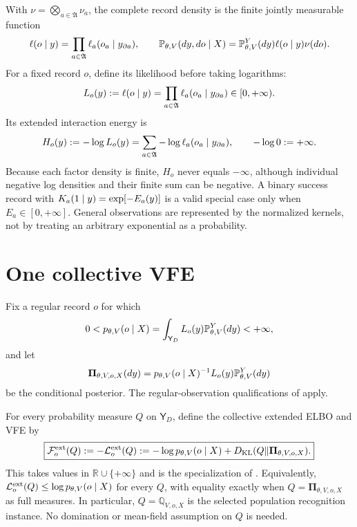 With $\nu=\bigotimes_{a\in\mathfrak A}\nu_a$, the complete record density is
the finite jointly measurable function
\begin{equation}
\ell(o\mid y)=\prod_{a\in\mathfrak A}
\ell_a(o_a\mid y_{\partial a}),
\qquad
\mathbb P_{\theta,V}(dy,do\mid X)
=\mathbb P_{\theta,V}^{Y}(dy)\ell(o\mid y)\nu(do).
\label{eq:obs-complete-record-kernel-density}
\end{equation}
For a fixed record $o$, define its likelihood before taking logarithms:
\begin{equation}
L_o(y):=\ell(o\mid y)
=\prod_{a\in\mathfrak A}\ell_a(o_a\mid y_{\partial a})
\in[0,+\infty).
\label{eq:obs-complete-record-likelihood}
\end{equation}
Its extended interaction energy is
\begin{equation}
H_o(y):=-\log L_o(y)
=\sum_{a\in\mathfrak A}-\log\ell_a(o_a\mid y_{\partial a}),
\qquad -\log0:=+\infty.
\label{eq:obs-interaction-energy}
\end{equation}
Because each factor density is finite, $H_o$ never equals $-\infty$, although
individual negative log densities and their finite sum can be negative.  A
binary success record with
$K_a(1\mid y)=\exp[-E_a(y)]$ is a valid special case only when
$E_a\in[0,+\infty]$.  General observations are represented by the normalized
kernels, not by treating an arbitrary exponential as a probability.

\section{One collective VFE}
\label{sec:local-collective-vfe}

Fix a regular record $o$ for which
\begin{equation}
0<p_{\theta,V}(o\mid X)
=\int_{\mathsf Y_D}L_o(y)\mathbb P_{\theta,V}^{Y}(dy)
<+\infty,
\label{eq:obs-global-evidence}
\end{equation}
and let
\begin{equation}
\boldsymbol\Pi_{\theta,V,o,X}(dy)
=p_{\theta,V}(o\mid X)^{-1}
L_o(y)\mathbb P_{\theta,V}^{Y}(dy)
\label{eq:obs-global-posterior}
\end{equation}
be the conditional posterior.  The regular-observation qualifications of
 apply.

For every probability measure \(Q\) on \(\mathsf Y_D\), define the collective
extended ELBO and VFE by
\begin{equation}
\boxed{
\mathcal F_o^{\rm ext}(Q):=-\mathcal L_o^{\rm ext}(Q)
:=-\log p_{\theta,V}(o\mid X)
+D_{\mathrm{KL}}(Q\Vert\boldsymbol\Pi_{\theta,V,o,X}).}
\label{eq:obs-collective-vfe}
\end{equation}
This takes values in \(\mathbb R\cup\{+\infty\}\) and is the specialization of
.  Equivalently,
\(\mathcal L_o^{\rm ext}(Q)\leq\log p_{\theta,V}(o\mid X)\) for every \(Q\),
with equality exactly when \(Q=\boldsymbol\Pi_{\theta,V,o,X}\) as full
measures. In particular, \(Q=\mathbb Q_{V,o,X}\) is the selected population
recognition instance. No domination or mean-field assumption on \(Q\) is
needed. 

